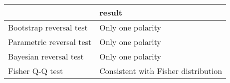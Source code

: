 \begin{tabular}{ll}
\toprule
{} &                               result \\
\midrule
Bootstrap reversal test  &                    Only one polarity \\
Parametric reversal test &                    Only one polarity \\
Bayesian reversal test   &                    Only one polarity \\
Fisher Q-Q test          &  Consistent with Fisher distribution \\
\bottomrule
\end{tabular}
